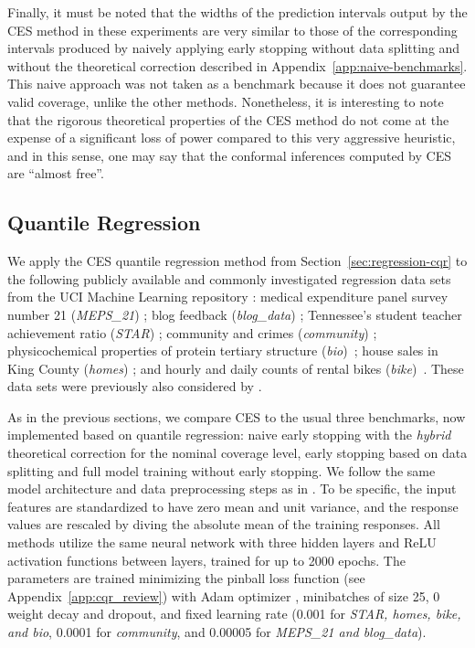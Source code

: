 Finally, it must be noted that the widths of the prediction intervals output by the CES method in these experiments are very similar to those of the corresponding intervals produced by naively applying early stopping without data splitting and without the theoretical correction described in Appendix~\ref{app:naive-benchmarks}.
This naive approach was not taken as a benchmark because it does not guarantee valid coverage, unlike the other methods. Nonetheless, it is interesting to note that the rigorous theoretical properties of the CES method do not come at the expense of a significant loss of power compared to this very aggressive heuristic, and in this sense, one may say that the conformal inferences computed by CES are ``almost free''.


\subsection{Quantile Regression}

We apply the CES quantile regression method from Section~\ref{sec:regression-cqr} to the following publicly available and commonly investigated regression data sets from the UCI Machine Learning repository \cite{Pinar2012}: medical expenditure panel survey number 21 ({\em MEPS\_21}) \cite{meps_21}; blog feedback ({\em blog\_data}) \cite{blog_data}; Tennessee’s student teacher achievement ratio ({\em STAR}) \cite{star}; community and crimes ({\em community}) \cite{community}; physicochemical properties of protein tertiary structure ({\em bio})~\cite{data-bio}; house sales in King County ({\em homes}) \cite{homes}; and hourly and daily counts of rental bikes ({\em bike})~\cite{data-bike}. These data sets were previously also considered by \citet{romano2019conformalized}.

As in the previous sections, we compare CES to the usual three benchmarks, now implemented based on quantile regression: naive early stopping with the {\em hybrid} theoretical correction for the nominal coverage level, early stopping based on data splitting and full model training without early stopping. We follow the same model architecture and data preprocessing steps as in \citet{romano2019conformalized}. To be specific, the input features are standardized to have zero mean and unit variance, and the response values are rescaled by diving the absolute mean of the training responses. All methods utilize the same neural network with three hidden layers and ReLU activation functions between layers, trained for up to 2000 epochs. The parameters are trained minimizing the pinball loss function (see Appendix~\ref{app:cqr_review}) with Adam optimizer \cite{kingma2014adam}, minibatches of size 25, 0 weight decay and dropout, and fixed learning rate (0.001 for {\em STAR, homes, bike, and bio}, 0.0001 for {\em community}, and 0.00005 for {\em MEPS\_21 and blog\_data}). 

